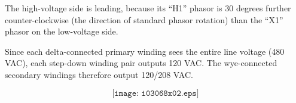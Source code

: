 \vskip 10pt

The high-voltage side is leading, because its ``H1'' phasor is 30 degrees further counter-clockwise (the direction of standard phasor rotation) than the ``X1'' phasor on the low-voltage side.

\vskip 10pt

Since each delta-connected primary winding sees the entire line voltage (480 VAC), each step-down winding pair outputs 120 VAC.  The wye-connected secondary windings therefore output 120/208 VAC.

\vskip 10pt

$$\texttt{[image: i03068x02.eps]}$$




